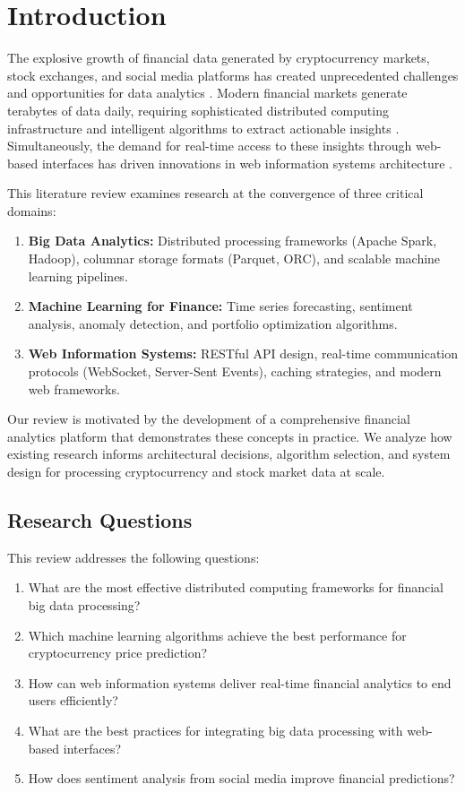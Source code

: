 \documentclass[conference]{IEEEtran}
\begin{document}
\section{Introduction}

The explosive growth of financial data generated by cryptocurrency markets, stock exchanges, and social media platforms has created unprecedented challenges and opportunities for data analytics \cite{gandhi2019big}. Modern financial markets generate terabytes of data daily, requiring sophisticated distributed computing infrastructure and intelligent algorithms to extract actionable insights \cite{chen2020big}. Simultaneously, the demand for real-time access to these insights through web-based interfaces has driven innovations in web information systems architecture \cite{singh2021web}.

This literature review examines research at the convergence of three critical domains:

\begin{enumerate}
    \item \textbf{Big Data Analytics:} Distributed processing frameworks (Apache Spark, Hadoop), columnar storage formats (Parquet, ORC), and scalable machine learning pipelines.
    \item \textbf{Machine Learning for Finance:} Time series forecasting, sentiment analysis, anomaly detection, and portfolio optimization algorithms.
    \item \textbf{Web Information Systems:} RESTful API design, real-time communication protocols (WebSocket, Server-Sent Events), caching strategies, and modern web frameworks.
\end{enumerate}

Our review is motivated by the development of a comprehensive financial analytics platform that demonstrates these concepts in practice. We analyze how existing research informs architectural decisions, algorithm selection, and system design for processing cryptocurrency and stock market data at scale.

\subsection{Research Questions}

This review addresses the following questions:

\begin{enumerate}
    \item What are the most effective distributed computing frameworks for financial big data processing?
    \item Which machine learning algorithms achieve the best performance for cryptocurrency price prediction?
    \item How can web information systems deliver real-time financial analytics to end users efficiently?
    \item What are the best practices for integrating big data processing with web-based interfaces?
    \item How does sentiment analysis from social media improve financial predictions?
\end{enumerate}
\end{document}
